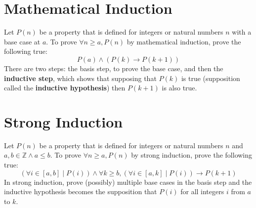 \documentclass[11pt]{article}
\begin{document}
\section{Mathematical Induction}
	Let $P(n)$ be a property that is defined for integers or natural numbers $n$ with a base case at $a$. To prove $\forall n \geq a, P(n)$ by mathematical induction, prove the following true:
	\begin{equation}
		P(a) \wedge ( P(k) \rightarrow P(k + 1) )
	\end{equation}
	There are two steps: the basis step, to prove the base case, and then the \textbf{inductive step}, which shows that supposing that $P(k)$ is true (supposition called the \textbf{inductive hypothesis}) then $P(k + 1)$ is also true.
	
\section{Strong Induction}
	Let $P(n)$ be a property that is defined for integers or natural numbers $n$ and $a, b \in \mathbb{Z} \wedge a \leq b$. To prove $\forall n \geq a, P(n)$ by strong induction, prove the following true:
	\begin{equation}
		(\forall i\in[a, b] \mid P(i)) \wedge \forall k \geq b, (\forall i \in [a, k] \mid P(i)) \rightarrow P(k+1)
	\end{equation}
	In strong induction, prove (possibly) multiple base cases in the basis step and the inductive hypothesis becomes the supposition that $P(i)$ for all integers $i$ from $a$ to $k$.

%		
%		


\end{document}
